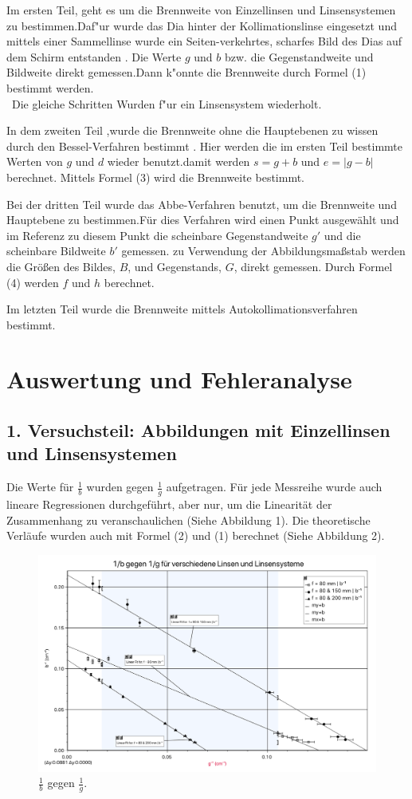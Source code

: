 \documentclass[11pt,a4paper]{article}
\begin{document}
Im ersten Teil, geht es um die Brennweite von Einzellinsen und Linsensystemen zu bestimmen.Daf"ur wurde das Dia hinter der Kollimationslinse eingesetzt und mittels einer Sammellinse wurde ein Seiten-verkehrtes, scharfes Bild des Dias auf dem Schirm entstanden .
Die Werte $g$ und $b$ bzw. die Gegenstandweite und Bildweite direkt gemessen.Dann k"onnte die Brennweite durch Formel (1) bestimmt werden.
\\\
Die gleiche Schritten Wurden f"ur ein Linsensystem wiederholt.

In dem zweiten Teil ,wurde die Brennweite ohne die Hauptebenen zu wissen durch den Bessel-Verfahren bestimmt .
Hier werden die im ersten Teil bestimmte Werten von $g$ und $d$ wieder benutzt.damit werden $s=g+b$ und $e=\left|g-b\right|$ berechnet. Mittels Formel (3) wird die Brennweite bestimmt.

Bei der dritten Teil wurde das Abbe-Verfahren benutzt, um die Brennweite und Hauptebene zu bestimmen.Für dies Verfahren wird einen Punkt ausgewählt und im Referenz zu diesem Punkt die scheinbare Gegenstandweite $g'$ und die scheinbare Bildweite $b'$ gemessen. zu Verwendung der Abbildungsmaßstab werden 
die Größen des Bildes, $B$, und Gegenstands, $G$, direkt gemessen. Durch Formel (4) werden $f$ und $h$ berechnet.

Im letzten Teil wurde die Brennweite mittels Autokollimationsverfahren bestimmt.

\section{Auswertung und Fehleranalyse}
\subsection{1. Versuchsteil: Abbildungen mit Einzellinsen und Linsensystemen}
Die Werte für $\frac{1}{b}$ wurden gegen $\frac{1}{g}$ aufgetragen. Für jede Messreihe wurde auch lineare Regressionen durchgeführt, aber nur, um die Linearität der Zusammenhang zu veranschaulichen (Siehe Abbildung 1). Die theoretische Verläufe wurden auch mit Formel (2) und (1) berechnet (Siehe Abbildung 2). 
\begin{figure}
	\centering
	\includegraphics[width=\linewidth]{Abb2}
	\caption{$\frac{1}{b}$ gegen $\frac{1}{g}$.}
\end{figure} 
\end{document}
